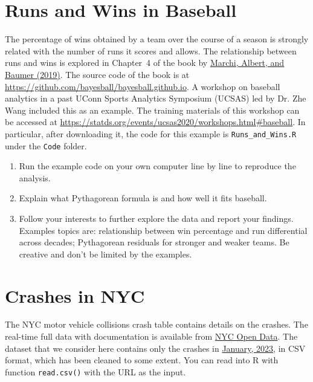 \documentclass[12pt]{article}
\begin{document}


\section{Runs and Wins in Baseball}
The percentage of wins obtained by a team over the course of a season
is strongly related with the number of runs it scores and allows. The
relationship between runs and wins is explored in Chapter~4 of the
book by
\href{https://www.amazon.com/gp/product/B07KRNP2BB/ref=dbs_a_def_rwt_bibl_vppi_i0}{Marchi,
  Albert, and Baumer (2019)}.
The source code of the book is at
\url{https://github.com/bayesball/bayesball.github.io}.
A workshop on baseball analytics in a past UConn Sports
Analytics Symposium (UCSAS) led by Dr. Zhe Wang included this as an
example. The training materials of this workshop can be accessed at
\url{https://statds.org/events/ucsas2020/workshops.html#baseball}.
In particular, after downloading it, the code for this example is
\texttt{Runs\_and\_Wins.R} under the \texttt{Code} folder.

\begin{enumerate}
\item
Run the example code on your own computer line by line to reproduce
the analysis.

\item
Explain what Pythagorean formula is and how well it fits baseball.

\item
Follow your interests to further explore the data and report your
findings. Examples topics are: relationship between win percentage and
run differential across decades; Pythagorean residuals for stronger
and weaker teams. Be creative and don't be limited by the
examples.
\end{enumerate}


\section{Crashes in NYC}
The NYC motor vehicle collisions crash table contains details on the crashes.
The real-time full data with documentation is available from 
\href{https://data.cityofnewyork.us/Public-Safety/Motor-Vehicle-Collisions-Crashes/h9gi-nx95}{NYC
  Open Data}.
The dataset that we consider here contains only the crashes in
\href{https://github.com/statds/ids-s23/blob/main/data/nyc_crashes_202301_cleaned.csv}{January,
  2023}, in CSV format, which has been cleaned to some extent.
You can read into R with function \texttt{read.csv()} with the URL as the input.
\end{document}
